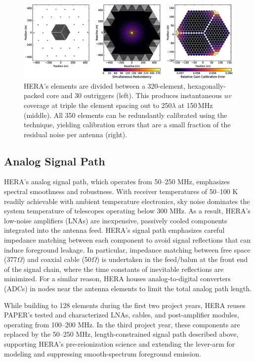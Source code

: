 \documentclass[preprint,11pt]{aastex}
\begin{document}
\begin{figure}[h]
	\centering
	\vspace{-5pt}
	\includegraphics[width=1\textwidth,clip]{plots/HERA_Array_Config.eps}
	\vspace{-25pt}
	\caption{HERA's elements are divided between a 320-element, hexagonally-packed core and 30 outriggers (left). This produces instantaneous
$uv$ coverage at triple the element spacing out to 250$\lambda$ at 150\,MHz (middle). All 350 elements can be redundantly calibrated 
using the \citet{liu_et_al2010} technique, yielding calibration errors that are a small fraction of the residual noise per antenna (right).}
		\label{fig:arrayConfig}
			\vspace{-10pt}
\end{figure}

\subsection{Analog Signal Path}

\noindent HERA's analog signal path, which operates from 50--250 MHz, emphasizes spectral smoothness and robustness.
With receiver temperatures of 50--100 K readily achievable with ambient temperature electronics, 
sky noise dominates the system temperature of telescopes operating below 300 MHz.  As a result,
HERA's low-noise amplifiers (LNAs) are inexpensive, passively cooled components integrated into the
antenna feed.  
HERA's signal path emphasizes careful impedance matching between each component to avoid signal reflections that can induce foreground leakage.
In particular, impedance matching between free space (377$\Omega$) and coaxial cable (50$\Omega$) is undertaken
in the feed/balun at the front end of the signal chain, where the time constants of inevitable reflections are
minimized.  For a similar reason, HERA houses analog-to-digital converters (ADCs) in nodes near the antenna elements
to limit the total analog path length.

While building to 128 elements during the first two project years, HERA reuses PAPER's tested and characterized 
LNAs, cables, and post-amplifier modules, operating
from 100--200 MHz.  In the third project year, these components are replaced by the 50--250 MHz, length-constrained signal
path described above, supporting HERA's pre-reionization science and extending the lever-arm for modeling and suppressing smooth-spectrum foreground emission.
\end{document}
